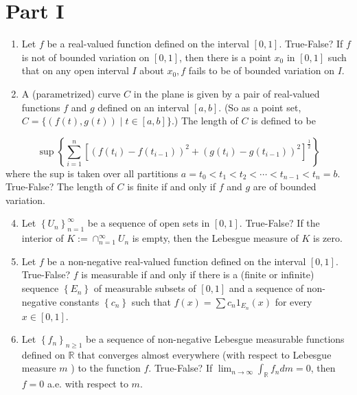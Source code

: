 \documentclass[10pt]{article}
\begin{document}
\section{Part I}
\begin{enumerate}
  \item Let $f$ be a real-valued function defined on the interval $[0,1]$. True-False? If $f$ is not of bounded variation on $[0,1]$, then there is a point $x_{0}$ in $[0,1]$ such that on any open interval $I$ about $x_{0}, f$ fails to be of bounded variation on $I$.

  \item A (parametrized) curve $C$ in the plane is given by a pair of real-valued functions $f$ and $g$ defined on an interval $[a, b]$. (So as a point set, $C=\{(f(t), g(t)) \mid t \in[a, b]\}$.) The length of $C$ is defined to be

\end{enumerate}
$$
\sup \left\{\sum_{i=1}^{n}\left[\left(f\left(t_{i}\right)-f\left(t_{i-1}\right)\right)^{2}+\left(g\left(t_{i}\right)-g\left(t_{i-1}\right)\right)^{2}\right]^{\frac{1}{2}}\right\}
$$
where the sup is taken over all partitions $a=t_{0}<t_{1}<t_{2}<\cdots<t_{n-1}<t_{n}=b$. True-False? The length of $C$ is finite if and only if $f$ and $g$ are of bounded variation.

\begin{enumerate}
  \setcounter{enumi}{3}
  \item Let $\left\{U_{n}\right\}_{n=1}^{\infty}$ be a sequence of open sets in $[0,1]$. True-False? If the interior of $K:=\cap_{n=1}^{\infty} U_{n}$ is empty, then the Lebesgue measure of $K$ is zero.

  \item Let $f$ be a non-negative real-valued function defined on the interval $[0,1]$. True-False? $f$ is measurable if and only if there is a (finite or infinite) sequence $\left\{E_{n}\right\}$ of measurable subsets of $[0,1]$ and a sequence of non-negative constants $\left\{c_{n}\right\}$ such that $f(x)=\sum c_{n} 1_{E_{n}}(x)$ for every $x \in[0,1]$.

  \item Let $\left\{f_{n}\right\}_{n \geq 1}$ be a sequence of non-negative Lebesgue measurable functions defined on $\mathbb{R}$ that converges almost everywhere (with respect to Lebesgue measure $m$ ) to the function $f$. True-False? If $\lim _{n \rightarrow \infty} \int_{\mathbb{R}} f_{n} d m=0$, then $f=0$ a.e. with respect to $m$.

\end{enumerate}
\end{document}
